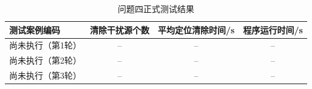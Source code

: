 \begin{table}[htbp]
  \centering
  \caption{问题四正式测试结果}
  \label{tab:formal4}
  \begin{tabular}{lccc}
    \toprule
    测试案例编码 & 清除干扰源个数 & 平均定位清除时间/s & 程序运行时间/s \\
    \midrule
    尚未执行（第1轮） & -- & -- & -- \\
    尚未执行（第2轮） & -- & -- & -- \\
    尚未执行（第3轮） & -- & -- & -- \\
    \bottomrule
  \end{tabular}
\end{table}
